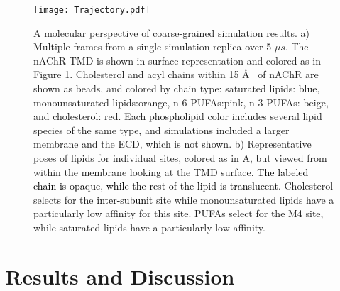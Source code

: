 \documentclass[%
 aip,
 amsmath,amssymb,
 preprint,%
]{revtex4-1}\usepackage{setspace}
\newcommand{\liam}[1]{\textcolor{black}{#1}}
\newcommand{\grace}[1]{\textcolor{black}{{#1}}}
\newcommand{\nachr}{nAChR}
\begin{document}
 \begin{figure}
	\center
	\texttt{[image: Trajectory.pdf]}
	\caption{{A molecular perspective of coarse-grained simulation results}. a) Multiple frames from a single simulation replica over 5 $\mu s$.   The \nachr{} TMD is shown in surface representation and colored as in Figure 1. Cholesterol and acyl chains within 15 \AA~ of \nachr{} are shown as beads, and colored by chain type: saturated lipids: blue, monounsaturated lipids:orange, n-6 PUFAs:pink, n-3 PUFAs: beige, and cholesterol: red.  Each phospholipid color includes several lipid species of the same type, and simulations included a larger membrane and the ECD, which is not shown.  b) Representative poses of lipids for individual sites, colored as in A, but viewed from within the membrane looking at the TMD surface. \grace{The labeled chain is opaque, while the rest of the lipid is translucent.} Cholesterol selects for the \liam{inter-subunit} site while monounsaturated lipids have a particularly low affinity for this site. PUFAs select for the M4 site, while saturated lipids have a particularly low affinity. }
	\label{fig:trj}
\end{figure}

\section{Results and Discussion}
\label{res}
\end{document}
